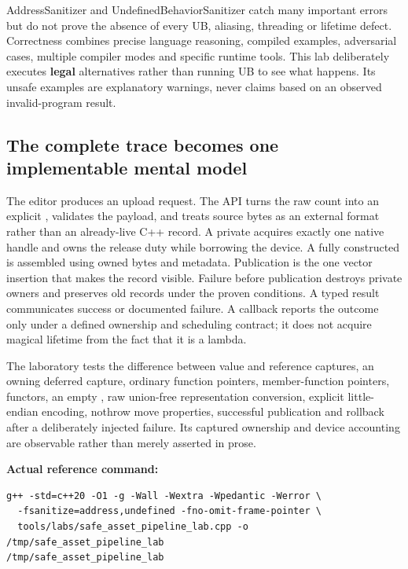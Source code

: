 AddressSanitizer and UndefinedBehaviorSanitizer catch many important errors but do not prove the absence of every UB, aliasing, threading or lifetime defect. Correctness combines precise language reasoning, compiled examples, adversarial cases, multiple compiler modes and specific runtime tools. This lab deliberately executes \textbf{legal} alternatives rather than running UB to see what happens. Its unsafe examples are explanatory warnings, never claims based on an observed invalid-program result.

\subsection{The complete trace becomes one implementable mental model}\label{01-foundations-i-ch004-the-complete-trace-becomes-one-implementable-mental-model}

\hypertarget{01-foundations-i-ch004-the-complete-trace-becomes-one-implementable-mental-model}{}

The editor produces an upload request. The API turns the raw count into an explicit , validates the payload, and treats source bytes as an external format rather than an already-live C++ record. A private  acquires exactly one native handle and owns the release duty while borrowing the device. A fully constructed  is assembled using owned bytes and metadata. Publication is the one vector insertion that makes the record visible. Failure before publication destroys private owners and preserves old records under the proven conditions. A typed result communicates success or documented failure. A callback reports the outcome only under a defined ownership and scheduling contract; it does not acquire magical lifetime from the fact that it is a lambda.

The laboratory tests the difference between value and reference captures, an owning deferred capture, ordinary function pointers, member-function pointers, functors, an empty , raw union-free representation conversion, explicit little-endian encoding, nothrow move properties, successful publication and rollback after a deliberately injected failure. Its captured ownership and device accounting are observable rather than merely asserted in prose.

\textbf{Actual reference command:}

\begin{verbatim}
g++ -std=c++20 -O1 -g -Wall -Wextra -Wpedantic -Werror \
  -fsanitize=address,undefined -fno-omit-frame-pointer \
  tools/labs/safe_asset_pipeline_lab.cpp -o /tmp/safe_asset_pipeline_lab
/tmp/safe_asset_pipeline_lab
\end{verbatim}

